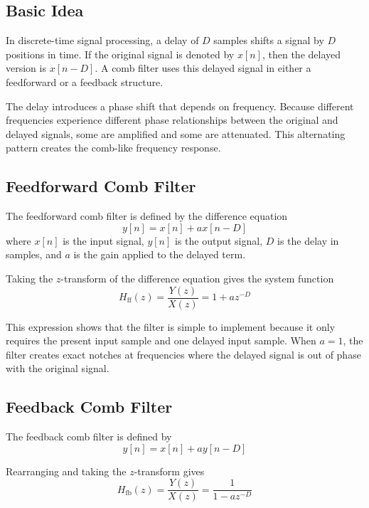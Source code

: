 \documentclass[11pt]{article}
\begin{document}
\subsection{Basic Idea}
In discrete-time signal processing, a delay of $D$ samples shifts a signal by $D$ positions in time. If the original signal is denoted by $x[n]$, then the delayed version is $x[n-D]$. A comb filter uses this delayed signal in either a feedforward or a feedback structure.

The delay introduces a phase shift that depends on frequency. Because different frequencies experience different phase relationships between the original and delayed signals, some are amplified and some are attenuated. This alternating pattern creates the comb-like frequency response.

\subsection{Feedforward Comb Filter}
The feedforward comb filter is defined by the difference equation
\begin{equation}
    y[n] = x[n] + a x[n-D]
\end{equation}
where $x[n]$ is the input signal, $y[n]$ is the output signal, $D$ is the delay in samples, and $a$ is the gain applied to the delayed term.

Taking the $z$-transform of the difference equation gives the system function
\begin{equation}
    H_{\mathrm{ff}}(z) = \frac{Y(z)}{X(z)} = 1 + a z^{-D}
\end{equation}

This expression shows that the filter is simple to implement because it only requires the present input sample and one delayed input sample. When $a = 1$, the filter creates exact notches at frequencies where the delayed signal is out of phase with the original signal.

\subsection{Feedback Comb Filter}
The feedback comb filter is defined by
\begin{equation}
    y[n] = x[n] + a y[n-D]
\end{equation}

Rearranging and taking the $z$-transform gives
\begin{equation}
    H_{\mathrm{fb}}(z) = \frac{Y(z)}{X(z)} = \frac{1}{1 - a z^{-D}}
\end{equation}
\end{document}
